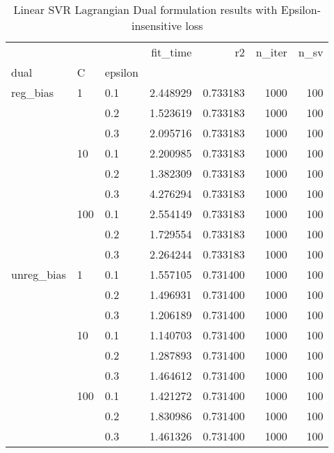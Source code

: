 \begin{table}[H]
\centering
\caption{Linear SVR Lagrangian Dual formulation results with Epsilon-insensitive loss}
\label{linear_lagrangian_dual_l1_svr_cv_results}
\begin{tabular}{lllrrrr}
\toprule
           &     &     &  fit\_time &        r2 &  n\_iter &  n\_sv \\
dual & C & epsilon &           &           &         &       \\
\midrule
reg\_bias & 1   & 0.1 &  2.448929 &  0.733183 &    1000 &   100 \\
           &     & 0.2 &  1.523619 &  0.733183 &    1000 &   100 \\
           &     & 0.3 &  2.095716 &  0.733183 &    1000 &   100 \\
           & 10  & 0.1 &  2.200985 &  0.733183 &    1000 &   100 \\
           &     & 0.2 &  1.382309 &  0.733183 &    1000 &   100 \\
           &     & 0.3 &  4.276294 &  0.733183 &    1000 &   100 \\
           & 100 & 0.1 &  2.554149 &  0.733183 &    1000 &   100 \\
           &     & 0.2 &  1.729554 &  0.733183 &    1000 &   100 \\
           &     & 0.3 &  2.264244 &  0.733183 &    1000 &   100 \\
unreg\_bias & 1   & 0.1 &  1.557105 &  0.731400 &    1000 &   100 \\
           &     & 0.2 &  1.496931 &  0.731400 &    1000 &   100 \\
           &     & 0.3 &  1.206189 &  0.731400 &    1000 &   100 \\
           & 10  & 0.1 &  1.140703 &  0.731400 &    1000 &   100 \\
           &     & 0.2 &  1.287893 &  0.731400 &    1000 &   100 \\
           &     & 0.3 &  1.464612 &  0.731400 &    1000 &   100 \\
           & 100 & 0.1 &  1.421272 &  0.731400 &    1000 &   100 \\
           &     & 0.2 &  1.830986 &  0.731400 &    1000 &   100 \\
           &     & 0.3 &  1.461326 &  0.731400 &    1000 &   100 \\
\bottomrule
\end{tabular}
\end{table}

